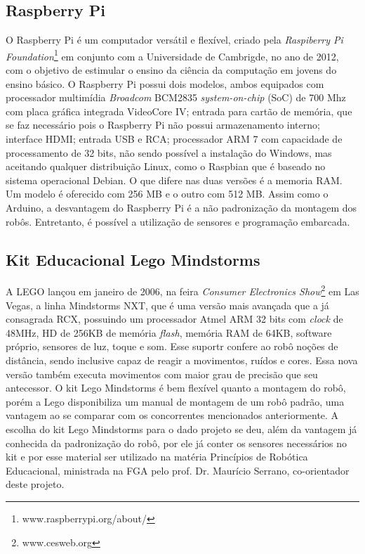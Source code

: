 \subsection{Raspberry Pi}
O Raspberry Pi é um computador versátil e flexível, criado pela \textit{Raspiberry Pi Foundation}\footnote{www.raspberrypi.org/about/} em conjunto com a Universidade de Cambrigde, no ano de 2012, com o objetivo de estimular o ensino da ciência da computação em jovens do ensino básico.
O Raspberry Pi possui dois modelos, ambos equipados com processador multimídia \textit{Broadcom} BCM2835 \textit{system-on-chip} (SoC) de 700 Mhz com placa gráfica integrada VideoCore IV; entrada para cartão de memória, que se faz necessário pois o Raspberry Pi não possui armazenamento interno; interface HDMI; entrada USB e RCA; processador ARM 7 com capacidade de processamento de 32 bits, não sendo possível a instalação do Windows, mas aceitando qualquer distribuição Linux, como o Raspbian que é baseado no sistema operacional Debian. O que difere nas duas versões é a memoria RAM. Um modelo é oferecido com 256 MB e o outro com 512 MB.
Assim como o Arduino, a desvantagem do Raspberry Pi é a não padronização da montagem dos robôs. Entretanto, é possível a utilização de sensores e programação embarcada.

\subsection{Kit Educacional Lego Mindstorms}
A LEGO lançou em janeiro de 2006, na feira \textit{Consumer Electronics Show}\footnote{www.cesweb.org} em Las Vegas, a linha Mindstorms NXT, que é uma versão mais avançada que a já consagrada RCX, possuindo um processador Atmel ARM 32 bits com \textit{clock} de 48MHz, HD de 256KB de memória \textit{flash}, memória RAM de 64KB, software próprio, sensores de luz, toque e som. Esse suportr confere ao robô noções de distância, sendo inclusive capaz de reagir a movimentos, ruídos e cores. Essa nova versão também executa movimentos com maior grau de precisão que seu antecessor.
O kit Lego Mindstorms é bem flexível quanto a montagem do robô, porém a Lego disponibiliza um manual de montagem de um robô padrão, uma vantagem ao se comparar com os concorrentes mencionados anteriormente. 
A escolha do kit Lego Mindstorms para o dado projeto se deu, além da vantagem já conhecida da padronização do robô, por ele já conter os sensores necessários no kit e por esse material ser utilizado na matéria Princípios de Robótica Educacional, ministrada na FGA pelo prof. Dr. Maurício Serrano, co-orientador deste projeto.  

